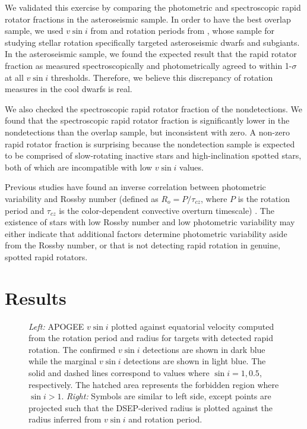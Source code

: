 \documentclass[manuscript]{aastex6}
\newcommand{\vsini}{\ensuremath{v \sin i}}
\begin{document}
We validated this exercise by comparing the photometric and spectroscopic
rapid rotator fractions in the asteroseismic sample. In order to have the best
overlap sample, we used \vsini{} from \citet{Bruntt12} and rotation periods
from \citet{Garcia14}, whose sample for studying stellar rotation specifically
targeted asteroseismic dwarfs and subgiants. In the asteroseismic
sample, we found the expected result that the rapid rotator
fraction as measured spectroscopically and photometrically agreed to within
1-\(\sigma\) at all \vsini{} thresholds. Therefore, we believe this
discrepancy of rotation measures in the cool dwarfs is real.

We also checked the spectroscopic rapid rotator fraction of the 
\citet{McQuillan14} nondetections. We found that the spectroscopic rapid 
rotator fraction is significantly
lower in the nondetections than the overlap sample, but inconsistent with zero. 
A non-zero rapid rotator fraction is surprising because the nondetection
sample is expected to be comprised of slow-rotating inactive stars and 
high-inclination spotted stars, both of which are incompatible with low 
\vsini{} values. 

Previous studies have found an inverse correlation between 
photometric variability and Rossby number (defined as \(R_o = P / \tau_{cz}\), where \(P\)
    is the rotation period and \(\tau_{cz}\) is the color-dependent 
convective overturn timescale) \citep{Messina01,Hartman09}. The existence of 
stars with low Rossby number and low photometric variability may either 
indicate that additional factors determine photometric variability 
aside from the Rossby number, or that \citet{McQuillan14} is not detecting 
rapid rotation in genuine, spotted rapid rotators.



\section{Results}
\label{sec:results}

\begin{figure*}
  \caption{\emph{Left:} APOGEE \vsini{} plotted against equatorial
  velocity computed from the rotation period and radius for targets with
  detected rapid rotation. The confirmed \vsini{} detections are shown
  in dark blue while the marginal \vsini{} detections are shown in light
  blue. The solid and dashed lines correspond to values where \(\sin i =
  1, 0.5\), respectively. The hatched area represents the forbidden
  region where \(\sin i > 1\). \emph{Right:} Symbols are similar to left
  side, except points are projected such that the DSEP-derived radius is
  plotted against the radius inferred from \vsini{} and rotation
  period.\label{fig:rot}}
\end{figure*}
\end{document}
